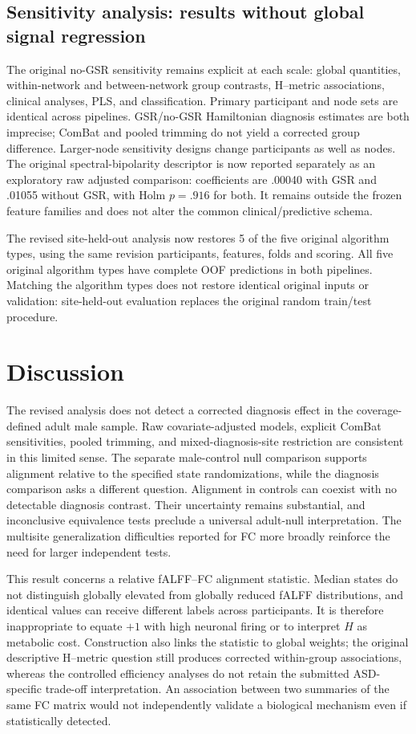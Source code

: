 \documentclass[10pt,letterpaper]{article}
\begin{document}
\subsection*{Sensitivity analysis: results without global signal regression}
The original no-GSR sensitivity remains explicit at each scale: global quantities,
within-network and between-network group contrasts, H--metric associations,
clinical analyses, PLS, and classification. Primary participant and node sets are
identical across pipelines. GSR/no-GSR Hamiltonian diagnosis estimates are both
imprecise; ComBat and pooled trimming do not yield a corrected group difference.
Larger-node sensitivity designs change participants as well as nodes.
The original spectral-bipolarity descriptor is now reported separately as an
exploratory raw adjusted comparison: coefficients are .00040 with GSR and .01055
without GSR, with Holm $p=.916$ for both. It remains outside the frozen feature
families and does not alter the common clinical/predictive schema.

The revised site-held-out analysis now restores 5 of the five original
algorithm types, using the same revision participants, features, folds and scoring.
All five original algorithm types have complete OOF predictions in both pipelines.
Matching the algorithm types does not restore identical original inputs or validation:
site-held-out evaluation replaces the original random train/test procedure.


\section*{Discussion}
The revised analysis does not detect a corrected diagnosis effect in the
coverage-defined adult male sample. Raw covariate-adjusted models, explicit
ComBat sensitivities, pooled trimming, and mixed-diagnosis-site restriction are
consistent in this limited sense. The separate male-control null comparison supports alignment relative to the
specified state randomizations, while the diagnosis comparison asks a different
question. Alignment in controls can coexist with no detectable diagnosis contrast.
Their uncertainty remains substantial, and
inconclusive equivalence tests preclude a universal adult-null interpretation.
The multisite generalization difficulties reported for FC more broadly
\cite{King2019revision} reinforce the need for larger independent tests.

This result concerns a relative fALFF--FC alignment statistic. Median states do
not distinguish globally elevated from globally reduced fALFF distributions,
and identical values can receive different labels across participants. It is
therefore inappropriate to equate $+1$ with high neuronal firing or to interpret
$H$ as metabolic cost. Construction also links the statistic to global weights;
the original descriptive H--metric question still produces corrected
within-group associations, whereas the controlled efficiency analyses do not
retain the submitted ASD-specific trade-off interpretation. An association between two summaries of the same FC matrix would
not independently validate a biological mechanism even if statistically detected.
\end{document}
